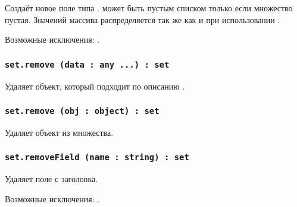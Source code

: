 Создаёт новое поле типа \str.  может быть пустым списком только если множество пустая. Значений массива распределяется так же как и при использовании .

Возможные исключения: .

\subsubsection{\lstinline|set.remove (data : any ...) : set|}

Удаляет объект, который подходит по описанию .

\subsubsection{\lstinline|set.remove (obj : object) : set|}

Удаляет объект  из множества.

\subsubsection{\lstinline|set.removeField (name : string) : set|}

Удаляет поле  с заголовка.

Возможные исключения: .

